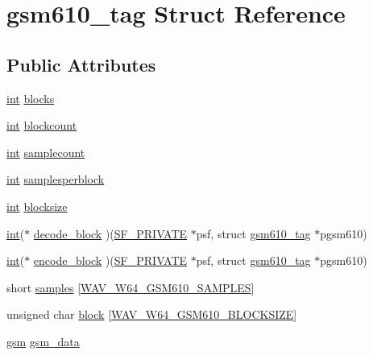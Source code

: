 \hypertarget{structgsm610__tag}{}\section{gsm610\+\_\+tag Struct Reference}
\label{structgsm610__tag}
\subsection*{Public Attributes}
\begin{DoxyCompactItemize}
\item 
\hyperlink{xmltok_8h_a5a0d4a5641ce434f1d23533f2b2e6653}{int} \hyperlink{structgsm610__tag_ae0272ba41ab8053b6215e547e129d9a3}{blocks}
\item 
\hyperlink{xmltok_8h_a5a0d4a5641ce434f1d23533f2b2e6653}{int} \hyperlink{structgsm610__tag_a6d0a099e7b5af9354f5241725ece75ea}{blockcount}
\item 
\hyperlink{xmltok_8h_a5a0d4a5641ce434f1d23533f2b2e6653}{int} \hyperlink{structgsm610__tag_a6d95670fdec1593066579e2ce52dbbad}{samplecount}
\item 
\hyperlink{xmltok_8h_a5a0d4a5641ce434f1d23533f2b2e6653}{int} \hyperlink{structgsm610__tag_a5b20073af371ad9d92d70fee31ef1e6f}{samplesperblock}
\item 
\hyperlink{xmltok_8h_a5a0d4a5641ce434f1d23533f2b2e6653}{int} \hyperlink{structgsm610__tag_a9d52f00652438a47d5b1d77895ce529d}{blocksize}
\item 
\hyperlink{xmltok_8h_a5a0d4a5641ce434f1d23533f2b2e6653}{int}($\ast$ \hyperlink{structgsm610__tag_a6b3edf99f5287989e374cd9404803771}{decode\+\_\+block} )(\hyperlink{libsndfile_2src_2common_8h_ab5debd339ecaf40f50a223e218900c24}{S\+F\+\_\+\+P\+R\+I\+V\+A\+TE} $\ast$psf, struct \hyperlink{structgsm610__tag}{gsm610\+\_\+tag} $\ast$pgsm610)
\item 
\hyperlink{xmltok_8h_a5a0d4a5641ce434f1d23533f2b2e6653}{int}($\ast$ \hyperlink{structgsm610__tag_a87978f5ff126050e1525bfbb7eae78d9}{encode\+\_\+block} )(\hyperlink{libsndfile_2src_2common_8h_ab5debd339ecaf40f50a223e218900c24}{S\+F\+\_\+\+P\+R\+I\+V\+A\+TE} $\ast$psf, struct \hyperlink{structgsm610__tag}{gsm610\+\_\+tag} $\ast$pgsm610)
\item 
short \hyperlink{structgsm610__tag_aadeef70999282aa6fe491c820f93027a}{samples} \mbox{[}\hyperlink{wav__w64_8h_a6cf016908662d447464844aea67621ad}{W\+A\+V\+\_\+\+W64\+\_\+\+G\+S\+M610\+\_\+\+S\+A\+M\+P\+L\+ES}\mbox{]}
\item 
unsigned char \hyperlink{structgsm610__tag_af3e75860abc54dbd4a065a40644076fa}{block} \mbox{[}\hyperlink{wav__w64_8h_a54224e6f89d08d8e560c66f81dbd8b09}{W\+A\+V\+\_\+\+W64\+\_\+\+G\+S\+M610\+\_\+\+B\+L\+O\+C\+K\+S\+I\+ZE}\mbox{]}
\item 
\hyperlink{gsm_8h_a4d91801ed0f45250f3570219abddbbff}{gsm} \hyperlink{structgsm610__tag_a1fe7dd70326992013b603767f3bb1bde}{gsm\+\_\+data}
\end{DoxyCompactItemize}


